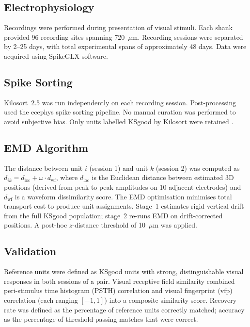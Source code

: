 \documentclass[11pt]{article}
\begin{document}
\subsection{Electrophysiology}

Recordings were performed during presentation of visual stimuli. Each shank provided 96 recording sites spanning 720~$\mu$m. Recording sessions were separated by 2--25 days, with total experimental spans of approximately 48 days. Data were acquired using SpikeGLX software.

\subsection{Spike Sorting}

Kilosort~2.5 \citep{pachitariu2016kilosort} was run independently on each recording session. Post-processing used the ecephys spike sorting pipeline. No manual curation was performed to avoid subjective bias. Only units labelled KSgood by Kilosort were retained \citep{hill2011quality}.

\subsection{EMD Algorithm}

The distance between unit $i$ (session 1) and unit $k$ (session 2) was computed as $d_{ik} = d_\text{loc} + \omega \cdot d_\text{wf}$, where $d_\text{loc}$ is the Euclidean distance between estimated 3D positions (derived from peak-to-peak amplitudes on 10 adjacent electrodes) and $d_\text{wf}$ is a waveform dissimilarity score. The EMD optimisation \citep{rubner2000earth} minimises total transport cost to produce unit assignments. Stage~1 estimates rigid vertical drift from the full KSgood population; stage~2 re-runs EMD on drift-corrected positions. A post-hoc $z$-distance threshold of 10~$\mu$m was applied.

\subsection{Validation}

Reference units were defined as KSgood units with strong, distinguishable visual responses in both sessions of a pair. Visual receptive field similarity combined peri-stimulus time histogram (PSTH) correlation and visual fingerprint (vfp) correlation (each ranging $[-1, 1]$) into a composite similarity score. Recovery rate was defined as the percentage of reference units correctly matched; accuracy as the percentage of threshold-passing matches that were correct.
\end{document}
